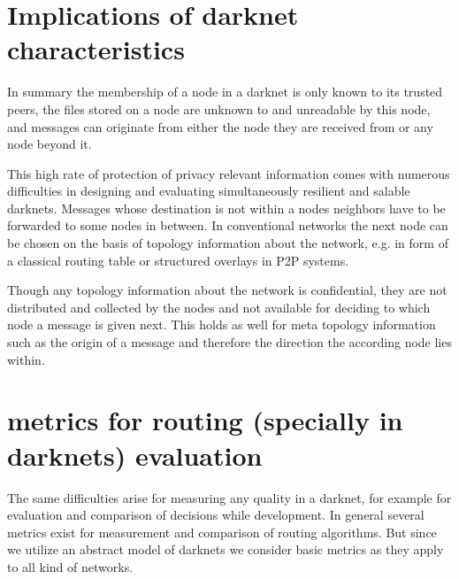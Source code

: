 \section{Implications of darknet characteristics}

In summary the membership of a node in a darknet is only known to its trusted peers, the files stored on a node are unknown to and unreadable by this node, and messages can originate from either the node they are received from or any node beyond it.

This high rate of protection of privacy relevant information comes with numerous difficulties in designing and evaluating simultaneously resilient and salable darknets. Messages whose destination is not within a nodes neighbors have to be forwarded to some nodes in between. In conventional networks the next node can be chosen on the basis of topology information about the network, e.g. in form of a classical routing table or structured overlays in P2P systems.

Though any topology information about the network is confidential, they are not distributed and collected by the nodes and not available for deciding to which node a message is given next. This holds as well for meta topology information such as the origin of a message and therefore the direction the according node lies within.

\section{metrics for routing (specially in darknets) evaluation}

The same difficulties arise for measuring any quality in a darknet, for example for evaluation and comparison of decisions while development. In general several metrics exist for measurement and comparison of routing algorithms. But since we utilize an abstract model of darknets we consider basic metrics as they apply to all kind of networks.

